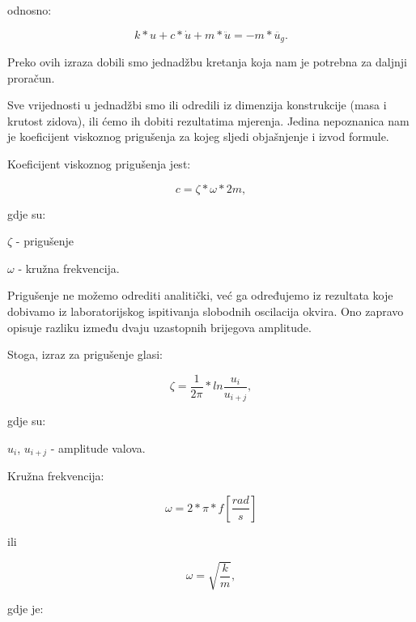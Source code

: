 \documentclass[12pt]{book}
\begin{document}
odnosno:

\begin{equation}\label{Jednadzba 3.11}
	k*u + c*\dot{u} + m*\ddot{u} = - m*\ddot{u_g}.
\end{equation}

Preko ovih izraza dobili smo jednadžbu kretanja koja nam je potrebna za daljnji proračun.

Sve vrijednosti u jednadžbi smo ili odredili iz dimenzija konstrukcije (masa i krutost zidova), ili ćemo ih dobiti rezultatima mjerenja. Jedina nepoznanica nam je koeficijent viskoznog prigušenja za kojeg sljedi objašnjenje i izvod formule.

\newpage



Koeficijent viskoznog prigušenja jest:

\begin{equation}\label{Jednadzba 3.12}
	c = \zeta * \omega *2m,
\end{equation}

gdje su:

$\zeta$ - prigušenje

$\omega$ - kružna frekvencija.

Prigušenje ne možemo odrediti analitički, već ga određujemo iz rezultata koje dobivamo iz laboratorijskog ispitivanja slobodnih oscilacija okvira. Ono zapravo opisuje razliku između dvaju uzastopnih brijegova amplitude.

Stoga, izraz za prigušenje glasi:

\begin{equation}\label{Jednadzba 3.13}
	\zeta = \frac{1}{2\pi} * ln\frac{u_i}{u_{i+j}},
\end{equation}

gdje su:

$u_i$, $u_{i+j}$ - amplitude valova.

Kružna frekvencija:

\begin{equation}\label{Jednadzba 3.14}
	\omega = 2 * \pi * f
	[\frac{rad}{s}] 
\end{equation}

\begin{center}
	ili
\end{center}

\begin{equation}\label{Jednadzba 3.15}
	\omega = \sqrt{\frac{k}{m}},
\end{equation}

gdje je:
\end{document}

